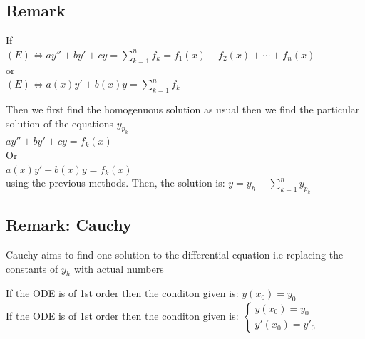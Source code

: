 \documentclass{article}
\begin{document}
\subsection{Remark}

If \\
\((E) \iff ay'' + by' + cy = \sum_{k=1}^n{f_{k}} = f_{1}(x) + f_{2}(x) + \cdots + f_{n}(x)\) \\
or \\
\((E) \iff a(x)y' + b(x)y = \sum_{k=1}^n{f_{k}}\)

Then we first find the homogenuous solution as usual
then we find the particular solution of the equations $y_{p_{k}}$\\
$ay'' + by' + cy = f_{k}(x)$\\
Or\\
$a(x)y' + b(x)y = f_{k}(x)$ \\
using the previous methods. Then, the solution is: $y = y_{h} + \sum_{k=1}^n  y_{p_{k}}$

\subsection{Remark: Cauchy}

Cauchy aims to find one solution to the differential equation i.e replacing the constants of $y_{h}$ with actual numbers

If the ODE is of 1st order then the conditon given is: $y(x_{0}) = y_{0}$ \\
If the ODE is of 1st order then the conditon given is: $\begin{cases}
y(x_{0}) = y_{0} \\
y'(x_{0}) = y'_{0}
\end{cases}$
\end{document}
